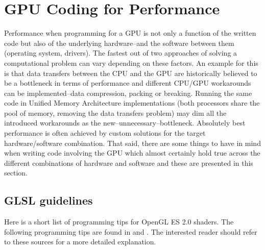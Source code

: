 \documentclass[conference]{IEEEtran}
\begin{document}

\section{GPU Coding for Performance}
Performance when programming for a GPU is not only a function of the written code but also of the underlying hardware--and the software between them (operating system, drivers). The fastest out of two approaches of solving a computational problem can vary depending on these factors. An example for this is that data transfers between the CPU and the GPU are historically believed to be a bottleneck in terms of performance and different CPU/GPU workarounds can be implemented--data compression, packing or breaking. Running the same code in Unified Memory Architecture implementations (both processors share the pool of memory, removing the data transfers problem) may dim all the introduced workarounds as the new--unnecessary--bottleneck. Absolutely best performance is often achieved by custom solutions for the target hardware/software combination. That said, there are some things to have in mind when writing code involving the GPU which almost certainly hold true across the different combinations of hardware and software and these are presented in this section.

	\subsection{GLSL guidelines}
Here is a short list of programming tips for OpenGL ES 2.0 shaders. The following programming tips are found in \cite{singhal12} and \cite{appleopengl}. The interested reader should refer to these sources for a more detailed explanation.
\end{document}
